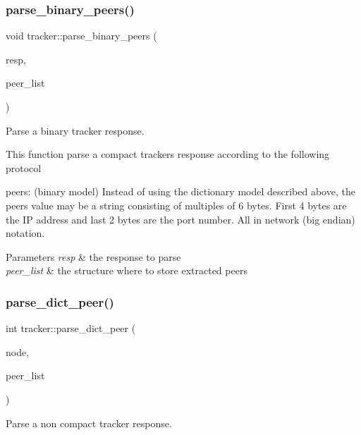 \subsubsection{\texorpdfstring{parse\+\_\+binary\+\_\+peers()}{parse\_binary\_peers()}}
{\footnotesize\ttfamily void tracker\+::parse\+\_\+binary\+\_\+peers (\begin{DoxyParamCaption}\item[{const string \&}]{resp,  }\item[{pwp\+::\+Peer\+List}]{peer\+\_\+list }\end{DoxyParamCaption})}



Parse a binary tracker response. 

This function parse a compact tracker\textquotesingle{}s response according to the following protocol

peers\+: (binary model) Instead of using the dictionary model described above, the peers value may be a string consisting of multiples of 6 bytes. First 4 bytes are the IP address and last 2 bytes are the port number. All in network (big endian) notation.


\begin{DoxyParams}{Parameters}
{\em resp} & the response to parse \\
\hline
{\em peer\+\_\+list} & the structure where to store extracted peers \\
\hline
\end{DoxyParams}
\mbox{\label{namespacetracker_a38d52cf6dd86f2a26a719e285097c805}} 
\subsubsection{\texorpdfstring{parse\+\_\+dict\+\_\+peer()}{parse\_dict\_peer()}}
{\footnotesize\ttfamily int tracker\+::parse\+\_\+dict\+\_\+peer (\begin{DoxyParamCaption}\item[{\hyperlink{structbe__node}{be\+\_\+node} $\ast$}]{node,  }\item[{pwp\+::\+Peer\+List}]{peer\+\_\+list }\end{DoxyParamCaption})}



Parse a non compact tracker response. 

